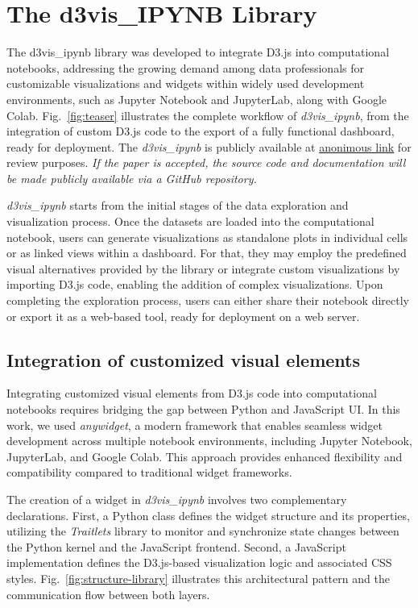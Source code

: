 \newpage
\section{The d3vis\_IPYNB Library}
The d3vis\_ipynb library was developed to integrate D3.js into computational notebooks, addressing the growing demand among data professionals for customizable visualizations and widgets within widely used development environments, such as Jupyter Notebook and JupyterLab, along with Google Colab. Fig.~\ref{fig:teaser} illustrates the complete workflow of \textit{d3vis\_ipynb}, from the integration of custom D3.js code to the export of a fully functional dashboard, ready for deployment. The \textit{d3vis\_ipynb} is publicly available at \href{https://anonymous.4open.science/r/d3visipynb-C47B/}{anonimous link} for review purposes. \emph{If the paper is accepted, the source code and documentation will be made publicly available via a GitHub repository.} %

\textit{d3vis\_ipynb} starts from the initial stages of the data exploration and visualization process. Once the datasets are loaded into the computational notebook, users can generate visualizations as standalone plots in individual cells or as linked views within a dashboard. For that, they may employ the predefined visual alternatives provided by the library or integrate custom visualizations by importing D3.js code, enabling the addition of complex visualizations. Upon completing the exploration process, users can either share their notebook directly or export it as a web-based tool, ready for deployment on a web server.


\subsection{Integration of customized visual elements}
Integrating customized visual elements from D3.js code into computational notebooks requires bridging the gap between Python and JavaScript UI. In this work, we used \emph{anywidget}, a modern framework that enables seamless widget development across multiple notebook environments, including Jupyter Notebook, JupyterLab, and Google Colab. This approach provides enhanced flexibility and compatibility compared to traditional widget frameworks.

The creation of a widget in \emph{d3vis\_ipynb} involves two complementary declarations. First, a Python class defines the widget structure and its properties, utilizing the \emph{Traitlets} library to monitor and synchronize state changes between the Python kernel and the JavaScript frontend. Second, a JavaScript implementation defines the D3.js-based visualization logic and associated CSS styles. Fig.~\ref{fig:structure-library} illustrates this architectural pattern and the communication flow between both layers.

